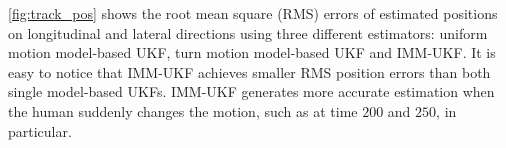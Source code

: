 \documentclass[journal]{IEEEtran}
\newcommand{\todonote}[1]{\vspace{0px} %
	\todo[inline, color=green!30]{\textbf{[Note:]} {#1}} %
}
\DeclareRobustCommand{\dhnote}[1]{\ifthenelse{\boolean{include-notes}}%
{\textcolor{blue}{\textbf{DH: #1}}}{}}
\begin{document}
  



	\cref{fig:track_pos} shows the root mean square (RMS) errors of estimated positions on longitudinal and lateral directions using three different estimators: uniform motion model-based UKF, turn motion model-based UKF and IMM-UKF. 
    It is easy to notice that IMM-UKF achieves smaller RMS position errors than both single model-based UKFs.
    IMM-UKF generates more accurate estimation when the human suddenly changes the motion, such as at time $200$ and $250$, in particular.
\end{document}
